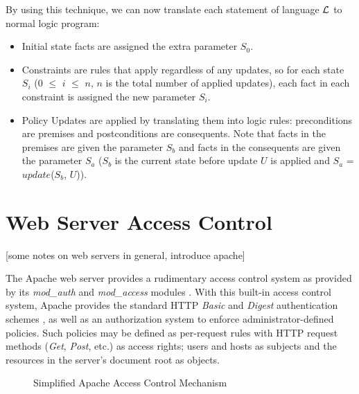\documentclass[11pt]{llncs}
\begin{document}
      By using this technique, we can now translate each statement of language
      ${\cal L}$ to normal logic program:

      \begin{itemize}
        \item
          Initial state facts are assigned the extra parameter $S_{0}$.
        \vspace{1mm}
        \item
          Constraints are rules that apply regardless of any updates, so
          for each state $S_{i}$ ($0$ $\leq$ $i$ $\leq$ $n$, $n$ is the total
          number of applied updates), each fact in each constraint is assigned
          the new parameter $S_{i}$.
        \vspace{1mm}
        \item
          Policy Updates are applied by translating them into logic rules:
          preconditions are premises and postconditions are consequents. Note
          that facts in the premises are given the parameter $S_{b}$ and
          facts in the consequents are given the parameter $S_{a}$ ($S_{b}$ is
          the current state before update $U$ is applied and $S_{a}$ =
          $update$($S_{b}$, $U$)).
      \end{itemize}

  \section{Web Server Access Control}

    [some notes on web servers in general, introduce apache]

    The Apache web server provides a rudimentary access control system as
    provided by its {\em mod\_auth} and {\em mod\_access} modules
    \cite{AP,LAU}. With this built-in access control system, Apache provides
    the standard HTTP {\em Basic} and {\em Digest} authentication schemes
    \cite{HTTP2}, as well as an authorization system to enforce
    administrator-defined policies. Such policies may be defined as per-request
    rules with HTTP request methods ({\em Get}, {\em Post}, etc.) \cite{HTTP1}
    as access rights; users and hosts as subjects and the resources in the
    server's document root as objects.

    \begin{figure}[ht]
      \begin{center}
        \caption{Simplified Apache Access Control Mechanism}
        \label{fig-1}
      \end{center}
    \end{figure}
\end{document}
